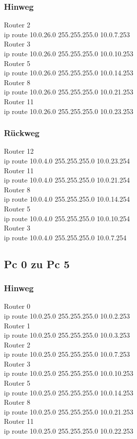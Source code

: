 \documentclass[a4paper]{article}
\begin{document}
\subsubsection{Hinweg}
Router 2\\
ip route 10.0.26.0 255.255.255.0 10.0.7.253 \\
Router 3\\
ip route 10.0.26.0 255.255.255.0 10.0.10.253\\
Router 5\\
ip route 10.0.26.0 255.255.255.0 10.0.14.253\\
Router 8\\
ip route 10.0.26.0 255.255.255.0 10.0.21.253\\
Router 11\\
ip route 10.0.26.0 255.255.255.0 10.0.23.253\\

\subsubsection{Rückweg}
Router 12\\
ip route 10.0.4.0 255.255.255.0 10.0.23.254\\
Router 11\\
ip route 10.0.4.0 255.255.255.0 10.0.21.254\\
Router 8\\
ip route 10.0.4.0 255.255.255.0 10.0.14.254\\
Router 5\\
ip route 10.0.4.0 255.255.255.0 10.0.10.254\\
Router 3\\
ip route 10.0.4.0 255.255.255.0 10.0.7.254\\

\subsection{Pc 0 zu Pc 5}

\subsubsection{Hinweg}

Router 0\\
ip route 10.0.25.0 255.255.255.0 10.0.2.253\\
Router 1\\
ip route 10.0.25.0 255.255.255.0 10.0.3.253\\
Router 2\\
ip route 10.0.25.0 255.255.255.0 10.0.7.253\\
Router 3\\
ip route 10.0.25.0 255.255.255.0 10.0.10.253\\
Router 5\\
ip route 10.0.25.0 255.255.255.0 10.0.14.253\\
Router 8\\
ip route 10.0.25.0 255.255.255.0 10.0.21.253\\
Router 11\\
ip route 10.0.25.0 255.255.255.0 10.0.22.253\\
\newpage
\end{document}
